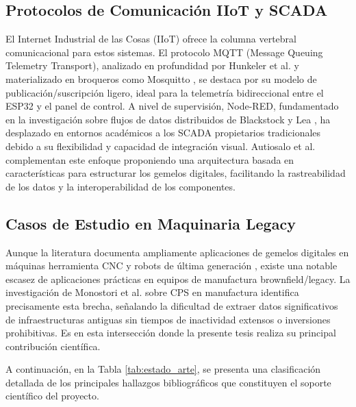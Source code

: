 \subsection*{Protocolos de Comunicación IIoT y SCADA}
El Internet Industrial de las Cosas (IIoT) ofrece la columna vertebral comunicacional para estos sistemas. El protocolo MQTT (Message Queuing Telemetry Transport), analizado en profundidad por Hunkeler et al. \cite{hunkeler2008} y materializado en broqueros como Mosquitto \cite{light2017}, se destaca por su modelo de publicación/suscripción ligero, ideal para la telemetría bidireccional entre el ESP32 y el panel de control. A nivel de supervisión, Node-RED, fundamentado en la investigación sobre flujos de datos distribuidos de Blackstock y Lea \cite{blackstock2014}, ha desplazado en entornos académicos a los SCADA propietarios tradicionales debido a su flexibilidad y capacidad de integración visual. Autiosalo et al. \cite{autiosalo2020} complementan este enfoque proponiendo una arquitectura basada en características para estructurar los gemelos digitales, facilitando la rastreabilidad de los datos y la interoperabilidad de los componentes.

\subsection*{Casos de Estudio en Maquinaria Legacy}
Aunque la literatura documenta ampliamente aplicaciones de gemelos digitales en máquinas herramienta CNC y robots de última generación \cite{qi2018}, existe una notable escasez de aplicaciones prácticas en equipos de manufactura brownfield/legacy. La investigación de Monostori et al. \cite{monostori2016} sobre CPS en manufactura identifica precisamente esta brecha, señalando la dificultad de extraer datos significativos de infraestructuras antiguas sin tiempos de inactividad extensos o inversiones prohibitivas. Es en esta intersección donde la presente tesis realiza su principal contribución científica.

A continuación, en la Tabla \ref{tab:estado_arte}, se presenta una clasificación detallada de los principales hallazgos bibliográficos que constituyen el soporte científico del proyecto.

